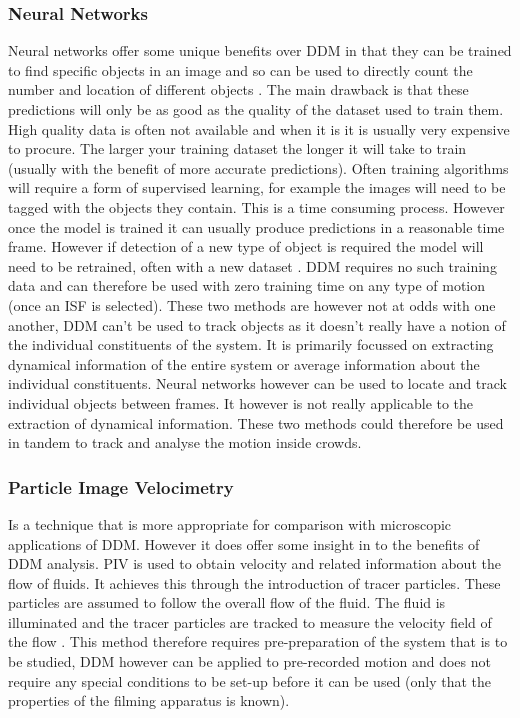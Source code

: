 \documentclass[10pt]{article}
\begin{document}
\subsubsection{Neural Networks}
Neural networks offer some unique benefits over DDM in that they can be trained to find specific objects in an image and so can be used to directly count the number and location of different objects \cite{yolov3}. The main drawback is that these predictions will only be as good as the quality of the dataset used to train them. High quality data is often not available and when it is it is usually very expensive to procure. The larger your training dataset the longer it will take to train (usually with the benefit of more accurate predictions). Often training algorithms will require a form of supervised learning, for example the images will need to be tagged with the objects they contain. This is a time consuming process. However once the model is trained it can usually produce predictions in a reasonable time frame. However if detection of a new type of object is required the model will need to be retrained, often with a new dataset \cite{tensorflow}. DDM requires no such training data and can therefore be used with zero training time on any type of motion (once an ISF is selected). These two methods are however not at odds with one another, DDM can't be used to track objects as it doesn't really have a notion of the individual constituents of the system. It is primarily focussed on extracting dynamical information of the entire system or average information about the individual constituents. Neural networks however can be used to locate and track individual objects between frames. It however is not really applicable to the extraction of dynamical information. These two methods could therefore be used in tandem to track and analyse the motion inside crowds.

\subsubsection{Particle Image Velocimetry}
Is a technique that is more appropriate for comparison with microscopic applications of DDM. However it does offer some insight in to the benefits of DDM analysis. PIV is used to obtain velocity and related information about the flow of fluids. It achieves this through the introduction of tracer particles. These particles are assumed to follow the overall flow of the fluid. The fluid is illuminated and the tracer particles are tracked to measure the velocity field of the flow \cite{piv}. This method therefore requires pre-preparation of the system that is to be studied, DDM however can be applied to pre-recorded motion and does not require any special conditions to be set-up before it can be used (only that the properties of the filming apparatus is known). 
\end{document}
